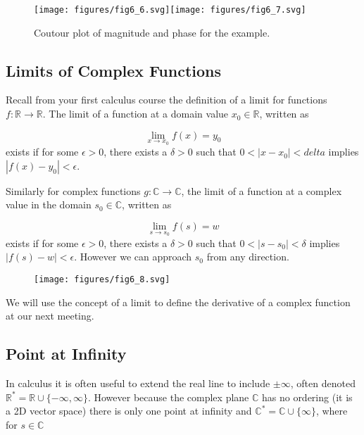 \documentclass{article}
\begin{document}
\begin{figure}
  \centering
  \texttt{[image: figures/fig6\_6.svg]}\texttt{[image: figures/fig6\_7.svg]}
  \caption{Coutour plot of magnitude and phase for the example.}
\end{figure}


\subsection{Limits of Complex Functions}

Recall from your first calculus course the definition of a limit for functions $f:\mathbb{R}\rightarrow\mathbb{R}$. The limit of a function at a domain value $x_0\in\mathbb{R}$, written as

\[
\lim_{x \rightarrow x_0} f(x) = y_0 
\]
exists if for some $\epsilon > 0$, there exists a $\delta > 0$ such that
$0 < |x-x_0| < delta$ implies $|f(x) - y_0| < \epsilon$.

Similarly for complex functions $g:\mathbb{C}\rightarrow\mathbb{C}$, the 
limit of a function at a complex value in the domain $s_0\in\mathbb{C}$, written as

\[
\lim_{s \rightarrow s_0} f(s) = w 
\]
exists if for some $\epsilon > 0$, there exists a $\delta > 0$ such that
$0 < |s-s_0| < \delta$ implies $|f(s) - w| < \epsilon$. However we can approach $s_0$ from any direction.

\begin{figure}
  \centering
  \texttt{[image: figures/fig6\_8.svg]}
\end{figure}

We will use the concept of a limit to define the derivative of a complex function at our next meeting.

\subsection{Point at Infinity}

In calculus it is often useful to extend the real line to include $\pm\infty$, often denoted $\mathbb{R}^* = \mathbb{R} \cup \{-\infty, \infty\}$. However because the complex plane $\mathbb{C}$ has no ordering (it is a 2D vector space) there is only one point at infinity and $\mathbb{C}^* = \mathbb{C} \cup \{\infty\}$, where for $s\in\mathbb{C}$
\end{document}
